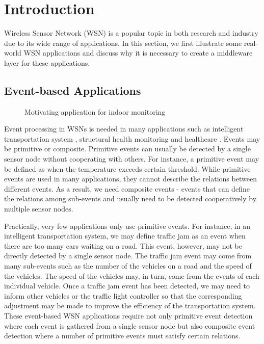 \section{Introduction}
\label{sec:introduction}
Wireless Sensor Network (WSN) is a popular topic in both research and industry due to its wide range of applications. In this section, we first illustrate some real-world WSN applications and discuss why it is necessary to create a middleware layer for these applications.

\subsection{Event-based Applications}

\begin{figure}
\centering
{}
\caption{Motivating application for indoor monitoring}
\label{fig:rooms}
\end{figure}

Event processing \cite{jector} in WSNs is needed in many applications such as intelligent transportation system \cite{klein:its}, structural health monitoring \cite{lynch:shm} and healthcare \cite{lo:ban}. Events may be primitive or composite. Primitive events can usually be detected by a single sensor node without cooperating with others. For instance, a primitive event may be defined as when the temperature exceeds certain threshold. While primitive events are used in many applications, they cannot describe the relations between different events. As a result, we need composite events - events that can define the relations among sub-events and usually need to be detected cooperatively by multiple sensor nodes.

Practically, very few applications only use primitive events. For instance, in an intelligent transportation system, we may define traffic jam as an event when there are too many cars waiting on a road. This event, however, may not be directly detected by a single sensor node. The traffic jam event may come from many sub-events such as the number of the vehicles on a road and the speed of the vehicles. The speed of the vehicles may, in turn, come from the events of each individual vehicle. Once a traffic jam event has been detected, we may need to inform other vehicles or the traffic light controller so that the corresponding adjustment may be made to improve the efficiency of the transportation system. These event-based WSN applications require not only primitive event detection where each event is gathered from a single sensor node but also composite event detection where a number of primitive events must satisfy certain relations.


